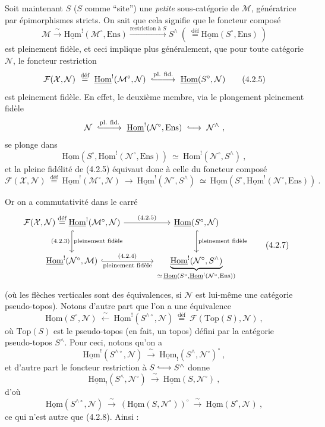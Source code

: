 \documentclass[11pt]{article}
\newcommand{\printedpage}[1]{\marginpar{\footnotesize p.~#1}}
\newcommand{\msp}[1]{\marginpar{\footnotesize [#1]}}
\newcommand{\cM}{\mathcal{M}}
\newcommand{\cN}{\mathcal{N}}
\newcommand{\cX}{\mathcal{X}}
\newcommand{\cF}{\mathcal{F}}
\newcommand{\uHom}{\underline{\mathrm{Hom}}}
\newcommand{\Hom}{\mathrm{Hom}}
\newcommand{\Ens}{\mathrm{Ens}}
\newcommand{\Top}{\mathrm{Top}}
\newcommand{\defeq}{\overset{\text{déf}}{=}}
\newcommand{\linj}{\lhook\joinrel\longrightarrow}
\begin{document}
Soit maintenant $S$ ($S$ comme “site”) une \textit{petite} sous-catégorie de $\cM$, génératrice par épimorphismes stricts. On sait que cela signifie que le foncteur composé
\[
\cM \xrightarrow{\ \sim\ } \uHom^{!}(\cM^{\circ},\Ens) \xrightarrow{\text{restriction à } S} S^{\wedge} \ (\ \defeq \uHom(S^{\circ},\Ens)\ )
\tag*{(4.2.4)}
\]
est pleinement fidèle, et ceci implique plus généralement, que pour toute catégorie $\cN$, le foncteur restriction
\[
\cF(\cX,\cN) \ \defeq\ \uHom^{!}(\cM^{\circ},\cN) \ \overset{\text{pl. fid.}}{\lhook\joinrel\relbar\joinrel\relbar\joinrel\longrightarrow}\ \uHom(S^{\circ},\cN)
\tag*{(4.2.5)}
\]
est pleinement fidèle. En effet, le deuxième membre, via le plongement pleinement fidèle
\[
\cN \ \overset{\text{pl. fid.}}{\lhook\joinrel\relbar\joinrel\relbar\joinrel\longrightarrow}\ \uHom^{!}(\cN^{\circ},\Ens) \ \linj\ \cN^{\wedge} \ ,
\]
se plonge dans
\[
\uHom(S^{\circ},\uHom^{!}(\cN^{\circ},\Ens)) \ \simeq\ \Hom^{!}(\cN^{\circ},S^{\wedge}) \ ,
\]
et la pleine fidélité de (4.2.5) équivaut donc à celle du foncteur composé
\[
\cF(\cX,\cN) \ \defeq\ \uHom^{!}(\cM^{\circ},\cN) \ \longrightarrow\ \uHom^{!}(\cN^{\circ},S^{\wedge}) \ \simeq\ \uHom(S^{\circ},\uHom^{!}(\cN^{\circ},\Ens)) \ .
\tag*{(4.2.6)}
\]

\msp{page 60}
Or on a commutativité dans le carré
\[
\begin{tikzcd}[column sep=large, row sep=large]
\cF(\cX,\cN) \defeq \uHom^{!}(\cM^{\circ},\cN) \arrow[r, "\text{\scriptsize(4.2.5)}"] \arrow[d, hook, "\text{\scriptsize(4.2.3)}"', "\text{\scriptsize pleinement fidèle}"] & \uHom(S^{\circ},\cN) \arrow[d, hook, "\text{\scriptsize pleinement fidèle}"] \\
\uHom^{!}(\cN^{\circ},\cM) \arrow[r, hook, "\text{\scriptsize(4.2.4)}", "\text{\scriptsize pleinement fidèle}"'] & \underbrace{\uHom^{!}(\cN^{\circ},S^{\wedge})}_{\simeq\, \uHom(S^{\circ},\uHom^{!}(\cN^{\circ},\Ens))}
\end{tikzcd}
\tag*{(4.2.7)}
\]
(où les flèches verticales sont des équivalences, si $\cN$ est lui-même une catégorie pseudo-topos). Notons d'autre part que l'on a une équivalence
\[
\uHom(S^{\circ},\cN) \ \xleftarrow{\ \sim\ }\ \uHom^{!}(S^{\wedge\circ},\cN) \ \defeq\ \cF(\Top(S),\cN) \ ,
\tag*{(4.2.8)}
\]
où $\Top(S)$ est le pseudo-topos (en fait, un topos) défini par la catégorie pseudo-topos $S^{\wedge}$. Pour ceci, notons qu'on a
\[
\uHom^{!}(S^{\wedge\circ},\cN) \ \xrightarrow{\ \sim\ }\ \uHom_{!}(S^{\wedge},\cN^{\circ})^{\circ} \ ,
\]
et d'autre part le foncteur restriction à $S \linj S^{\wedge}$ donne
\[
\uHom_{!}(S^{\wedge},\cN^{\circ}) \ \xrightarrow{\ \sim\ }\ \uHom(S,\cN^{\circ}) \ ,
\]
d'où
\printedpage{6}
\msp{page 61}
\[
\uHom(S^{\wedge\circ},\cN) \ \xrightarrow{\ \sim\ }\ (\uHom(S,\cN^{\circ}))^{\circ} \ \xrightarrow{\ \sim\ }\ \uHom(S^{\circ},\cN) \ ,
\]
ce qui n'est autre que (4.2.8). Ainsi :
\end{document}
